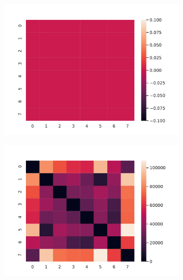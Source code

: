\documentclass[10pt]{beamer}
\begin{document}
\begin{frame}[fragile]{}
\begin{figure}[ht]
  \begin{subfigure}{.32 \linewidth}
    \includegraphics[scale=0.2]{persistence_diagrams/distances/heatmaps/wasserstein_h0.npy.pdf}
  \end{subfigure}%
  \begin{subfigure}{.32 \linewidth}
    \includegraphics[scale=0.2]{persistence_diagrams/distances/heatmaps/wasserstein_h1.npy.pdf}
  \end{subfigure}%
  \begin{subfigure}{.32 \linewidth}

\end{subfigure}
\end{figure}
\end{frame}
\end{document}

